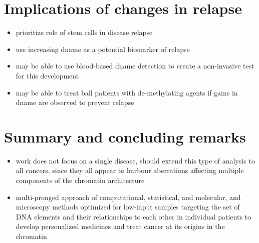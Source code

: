 \section{Implications of  changes in relapse}

\begin{itemize}
  \item prioritize role of stem cells in disease relapse
  \item use increasing \gls{dname} as a potential biomarker of relapse
  \item may be able to use blood-based \gls{dname} detection to create a non-invasive test for this development
  \item may be able to treat \gls{ball} patients with de-methylating agents if gains in \gls{dname} are observed to prevent relapse
\end{itemize}

\section{Summary and concluding remarks}

\begin{itemize}
  \item work does not focus on a single disease, should extend this type of analysis to all cancers, since they all appear to harbour aberrations affecting multiple components of the chromatin architecture
  \item multi-pronged approach of computational, statistical, and molecular, and microscopy methods optimized for low-input samples targeting the set of DNA elements and their relationships to each other in individual patients to develop personalized medicines and treat cancer at its origins in the chromatin
\end{itemize}
